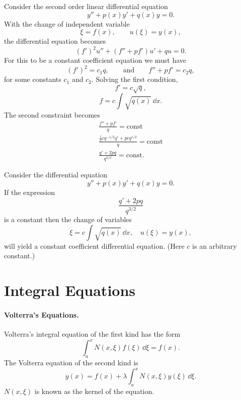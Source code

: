 Consider the second order linear differential equation
\[
y'' + p(x) y' + q(x) y = 0.
\]
With the change of independent variable
\[
\xi = f(x), \qquad u(\xi)=y(x),
\]
the differential equation becomes
\[
(f')^2 u'' + (f'' + p f') u' + q u = 0.
\]
For this to be a constant coefficient equation we must have
\[
(f')^2 = c_1 q, \qquad \mathrm{and} \qquad f'' + p f' = c_2 q,
\]
for some constants $c_1$ and $c_2$.
Solving the first condition,
\[
f' = c \sqrt{q},
\]
\[
f = c \int \sqrt{q(x)} \,\dd x.
\]
The second constraint becomes
\begin{gather*}
  \frac{f'' + p f'}{q} = \mathrm{const} \\
  \frac{\frac{1}{2} c q^{-1/2} q' + p c q^{1/2}}{q} = \mathrm{const} \\
  \frac{q' + 2 p q}{q^{3/2}} = \mathrm{const}.
\end{gather*}



\begin{Result}
  Consider the differential equation
  \[
  y'' + p(x) y' + q(x) y = 0.
  \]
  If the expression
  \[
  \frac{q' + 2 p q}{q^{3/2}}
  \]
  is a constant then the change of variables
  \[
  \xi = c \int \sqrt{q(x)} \,\dd x, \quad u(\xi) = y(x),
  \]
  will yield a constant coefficient differential equation.  (Here $c$ is
  an arbitrary constant.)
\end{Result}





















\section{Integral Equations}


\paragraph{Volterra's Equations.}
Volterra's integral equation of the first kind has the form
\[
\int_a^x N(x,\xi) f(\xi) \,\dd \xi = f(x).
\]
The Volterra equation of the second kind is
\[
y(x) = f(x) + \lambda \int_a^x N(x,\xi) y(\xi) \,\dd \xi.
\]
$N(x,\xi)$ is known as the kernel of the equation.




